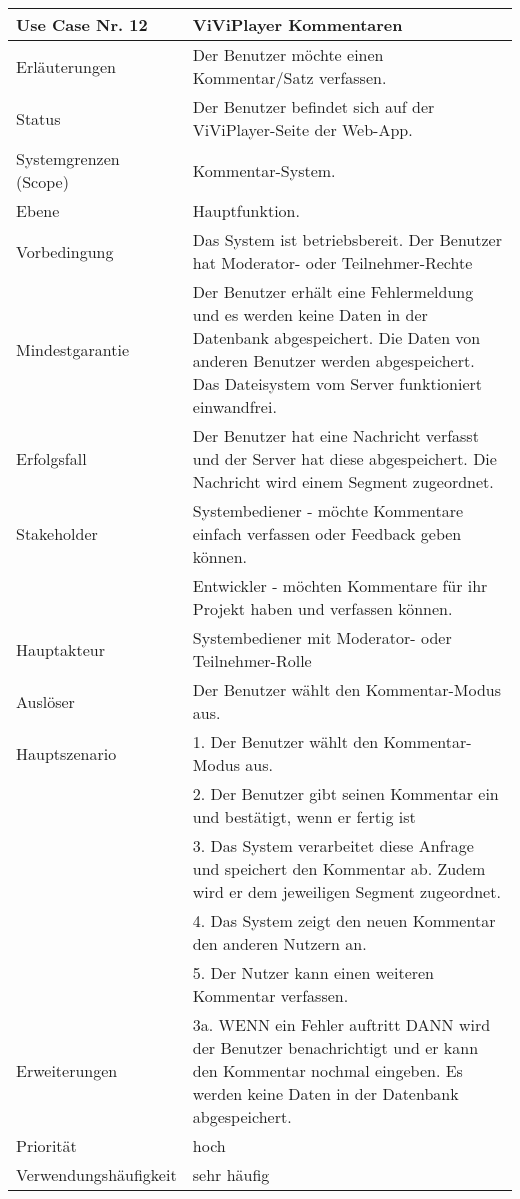 \begin{tabularx}{\linewidth}{|l|X|}
	\hline
	Use Case Nr. 12			& \textbf{ViViPlayer Kommentaren} \\ \hline
	Erläuterungen			&  Der Benutzer möchte einen Kommentar/Satz verfassen. \\ \hline
	Status					&  Der Benutzer befindet sich auf der ViViPlayer-Seite der Web-App. 
							   \\ \hline
	Systemgrenzen (Scope)	&  Kommentar-System. \\ \hline
	Ebene					&  Hauptfunktion. \\ \hline
	Vorbedingung			&  Das System ist betriebsbereit. Der Benutzer hat Moderator- oder 
							   Teilnehmer-Rechte\\ \hline
	Mindestgarantie			&  Der Benutzer erhält eine Fehlermeldung und es werden keine Daten 
							   in der Datenbank abgespeichert. Die Daten von anderen Benutzer werden abgespeichert. Das Dateisystem vom Server funktioniert einwandfrei. \\ \hline
	Erfolgsfall				&  Der Benutzer hat eine Nachricht verfasst und der Server hat 
							   diese abgespeichert. Die Nachricht wird einem Segment zugeordnet.\\ \hline
	Stakeholder				&  Systembediener - möchte Kommentare einfach verfassen oder 
							   Feedback geben können.\\ 
                            &  Entwickler - möchten Kommentare für ihr Projekt haben und 
                               verfassen können. \\ \hline
	Hauptakteur				&  Systembediener mit Moderator- oder Teilnehmer-Rolle \\ \hline
	Auslöser				&  Der Benutzer wählt den Kommentar-Modus aus. \\ \hline	
	Hauptszenario			&  1. Der Benutzer wählt den Kommentar-Modus aus. \\
                            &  2. Der Benutzer gibt seinen Kommentar ein und bestätigt, wenn er 
                               fertig ist\\
							&  3. Das System verarbeitet diese Anfrage und speichert den 
							   Kommentar ab. Zudem wird er dem jeweiligen Segment zugeordnet. \\
							&  4. Das System zeigt den neuen Kommentar den anderen Nutzern an.\\
							&  5. Der Nutzer kann einen weiteren Kommentar verfassen. \\ \hline
	Erweiterungen			&  3a. WENN ein Fehler auftritt DANN wird der Benutzer 
							   benachrichtigt und er kann den Kommentar nochmal eingeben. Es werden keine Daten in der Datenbank abgespeichert.\\ \hline
	Priorität				&  hoch \\ \hline
	Verwendungshäufigkeit	&  sehr häufig \\ \hline
\end{tabularx}
